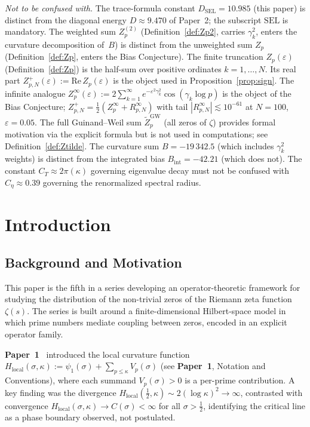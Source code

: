 \documentclass[11pt]{article}
\newcommand{\Hlocal}{H_{\mathrm{local}}}
\newcommand{\DSEL}{D_{\mathrm{SEL}}}
\newcommand{\Ceta}{C_{\eta}}
\newcommand{\CT}{C_{T}}
\begin{document}
\medskip
\emph{Not to be confused with.}
The trace-formula constant $\DSEL=10.985$ (this paper) is distinct
from the diagonal energy $D\approx 9.470$ of Paper~2; the subscript
$\mathrm{SEL}$ is mandatory.
The weighted sum $Z_p^{(2)}$ (Definition~\ref{def:Zp2}, carries
$\gamma_k^2$, enters the curvature decomposition of~$B$) is distinct
from the unweighted sum $Z_p$ (Definition~\ref{def:Zp}, enters the
Bias Conjecture).
The finite truncation $Z_p(\varepsilon)$ (Definition~\ref{def:Zp})
is the half-sum over positive ordinates $k=1,\ldots,N$.
Its real part $Z_{p,N}^+(\varepsilon) := \mathrm{Re}\,Z_p(\varepsilon)$
is the object used in Proposition~\ref{prop:sign}.
The infinite analogue $Z_p^\infty(\varepsilon)
:= 2\sum_{k=1}^\infty e^{-\varepsilon^2\gamma_k^2}\cos(\gamma_k\log p)$
is the object of the Bias Conjecture;
$Z_{p,N}^+ = \tfrac{1}{2}(Z_p^\infty + R_{p,N}^\infty)$
with tail $|R_{p,N}^\infty|\lesssim 10^{-61}$ at $N=100$, $\varepsilon=0.05$.
The full Guinand--Weil sum $\widetilde Z_p^{\mathrm{GW}}$ (all zeros of $\zeta$)
provides formal motivation via the explicit formula but is not used
in computations; see Definition~\ref{def:Ztilde}.
The curvature sum $B=-19\,342.5$ (which includes
$\gamma_k^2$ weights) is distinct from the integrated bias
$B_{\mathrm{int}}=-42.21$ (which does not).
The constant $\CT\approx 2\pi(\kappa)$ governing eigenvalue decay
must not be confused with $\Ceta\approx 0.39$ governing the
renormalized spectral radius.

\newpage

\section{Introduction}
\label{sec:intro}

\subsection{Background and Motivation}

This paper is the fifth in a series developing an operator-theoretic
framework for studying the distribution of the non-trivial zeros of the
Riemann zeta function $\zeta(s)$. The series is built around a
finite-dimensional Hilbert-space model in which prime numbers
mediate coupling between zeros, encoded in an explicit operator family.

\textbf{Paper~1}~\cite{Paper1} introduced the local curvature function
$\Hlocal(\sigma,\kappa) :=
     \psi_1(\sigma) + \sum_{p\leq\kappa}V_p(\sigma)$
(see \textbf{Paper~1}, Notation and Conventions),
where each summand $V_p(\sigma)>0$ is a per-prime contribution.
A key finding was the divergence
$\Hlocal(\tfrac{1}{2},\kappa)\sim 2(\log\kappa)^2\to\infty$,
contrasted with convergence $\Hlocal(\sigma,\kappa)\to C(\sigma)<\infty$
for all $\sigma>\tfrac{1}{2}$, identifying the critical line as a phase
boundary observed, not postulated.
\end{document}
